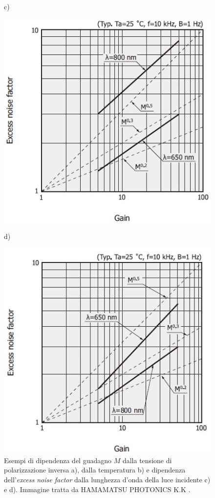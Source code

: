 \begin{figure}[tbh]
\begin{minipage}{.45\textwidth}
	\end{minipage}
	c)
	\begin{minipage}{.45\textwidth}
		\includegraphics[width=\linewidth]{./ImageFiles/apd_wave1.jpg}
	\end{minipage}
	d)
	\begin{minipage}{.45\textwidth}
		\includegraphics[width=\linewidth]{./ImageFiles/apd_wave2.jpg}
	\end{minipage}
	\caption{Esempi di dipendenza del guadagno $M$ dalla tensione di polarizzazione inversa a), dalla temperatura b) e dipendenza dell'\textit{excess noise factor} dalla lunghezza d'onda della luce incidente c) e d). Immagine tratta da HAMAMATSU PHOTONICS K.K \cite{HAMAMATSU2021}.}
	\label{fig:apd_gain}
\end{figure}
